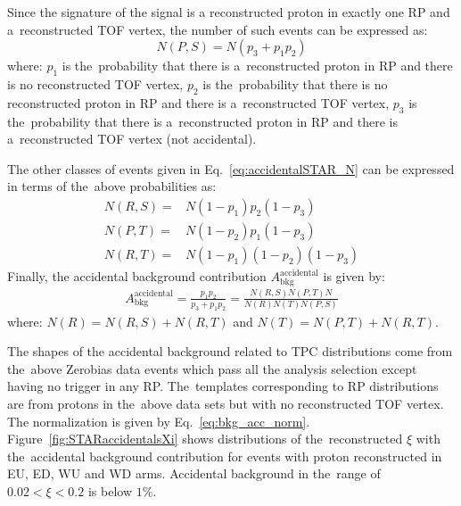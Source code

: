 Since the signature of the signal is a reconstructed proton in exactly one RP and a~reconstructed TOF vertex, the number of such events can be expressed as:
\begin{equation}
N(P,S)=N\left(p_3+p_1p_2\right)
\end{equation}
where: $p_1$ is the~probability that there is a~reconstructed proton in RP and there is no reconstructed TOF vertex, $p_2$ is the~probability that there is no reconstructed proton in RP and  there is a~reconstructed TOF vertex, $p_3$ is the~probability that there is a~reconstructed proton in RP and  there is a~reconstructed TOF vertex (not accidental).

The other classes of events given in Eq.~\eqref{eq:accidentalSTAR_N} can be expressed in terms of the~above probabilities as:
\begin{equation}
\begin{split}
N(R,S)=  & N(1-p_1)p_2(1-p_3)\\
N(P,T) = & N(1-p_2)p_1(1-p_3)\\
N(R,T) = & N(1-p_1)(1-p_2)(1-p_3)
\end{split}
\end{equation}
Finally, the accidental background contribution $A_{\mathrm{bkg} }^{\mathrm{accidental}}$ is  given by:
\begin{equation}
\begin{split}
A_{\mathrm{bkg}}^{\mathrm{accidental}}=  \frac{p_1p_2}{p_3+p_1p_2}=\frac{N(R,S)N(P,T)N}{N(R)N(T)N(P,S)}
\end{split}
\label{eq:bkg_acc_norm}
\end{equation} 
where: $N(R)=N(R,S)+N(R,T)$ and $N(T)=N(P,T)+N(R,T)$.

The shapes of the accidental background related to TPC distributions come from the~above Zerobias data events which pass all the analysis selection except having no trigger in any RP. The~templates corresponding to RP distributions are from protons in the~above data sets but with no reconstructed TOF vertex. The normalization is given by Eq.~\eqref{eq:bkg_acc_norm}. Figure~\ref{fig:STARaccidentalsXi} shows distributions of the~reconstructed $\xi$ with the~accidental background contribution  for events with proton reconstructed in EU, ED, WU and WD arms. Accidental background in the~range of $0.02<\xi<0.2$ is below $1\%$.

